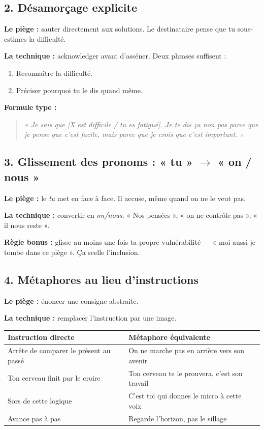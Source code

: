 \documentclass[11pt,a4paper]{article}
\begin{document}
\subsection{2. Désamorçage explicite}

\textbf{Le piège :} sauter directement aux solutions. Le destinataire pense que tu sous-estimes la difficulté.

\textbf{La technique :} acknowledger avant d'asséner. Deux phrases suffisent :
\begin{enumerate}[leftmargin=*, itemsep=2pt]
  \item Reconnaître la difficulté.
  \item Préciser pourquoi tu le dis quand même.
\end{enumerate}

\textbf{Formule type :}
\begin{quote}
\textit{« Je sais que [X est difficile / tu es fatigué]. Je te dis ça non pas parce que je pense que c'est facile, mais parce que je crois que c'est important. »}
\end{quote}

\subsection{3. Glissement des pronoms : « tu » $\rightarrow$ « on / nous »}

\textbf{Le piège :} le \textit{tu} met en face à face. Il accuse, même quand on ne le veut pas.

\textbf{La technique :} convertir en \textit{on/nous}. « Nos pensées », « on ne contrôle pas », « il nous reste ».

\textbf{Règle bonus :} glisse au moins une fois ta propre vulnérabilité — « moi aussi je tombe dans ce piège ». Ça scelle l'inclusion.

\subsection{4. Métaphores au lieu d'instructions}

\textbf{Le piège :} énoncer une consigne abstraite.

\textbf{La technique :} remplacer l'instruction par une image.

\vspace{0.5em}
\begin{tabularx}{\linewidth}{XX}
\toprule
\textbf{Instruction directe} & \textbf{Métaphore équivalente} \\
\midrule
Arrête de comparer le présent au passé & On ne marche pas en arrière vers son avenir \\
Ton cerveau finit par le croire & Ton cerveau te le prouvera, c'est son travail \\
Sors de cette logique & C'est toi qui donnes le micro à cette voix \\
Avance pas à pas & Regarde l'horizon, pas le sillage \\
\bottomrule
\end{tabularx}
\end{document}

